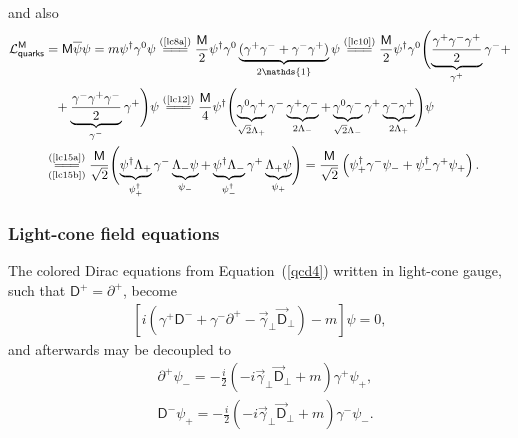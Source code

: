 \begin{note}
\begin{align*}
\end{align*}
and also
\begin{align*}
\mathcal{L}_{\textsf{quarks}}^\textsf{M}&=\textsf{M}\overline{\psi}\psi=m\psi^\dag\gamma^0\psi\stackrel{(\text{\cref{lc8a}})}{=\joinrel=\joinrel=}\frac{\textsf{M}}{2}\psi^\dag\gamma^0\underbrace{(\gamma^+\gamma^-+\gamma^-\gamma^+)}_{2\mathds{1}}\psi\stackrel{(\text{\cref{lc10}})}{=\joinrel=\joinrel=}\frac{\textsf{M}}{2}\psi^\dag\gamma^0\Biggl(\underbrace{\frac{\gamma^+\gamma^-\gamma^+}{2}}_{\gamma^+}\gamma^-+\\
&\phantom{=}+\underbrace{\frac{\gamma^-\gamma^+\gamma^-}{2}}_{\gamma^-}\gamma^+\Biggr)\psi\stackrel{(\text{\cref{lc12}})}{=\joinrel=\joinrel=}\frac{\textsf{M}}{4}\psi^\dag\Biggl(\underbrace{\gamma^0\gamma^+}_{\sqrt{2}\Lambda_+}\gamma^-\underbrace{\gamma^+\gamma^-}_{2\Lambda_-}+\underbrace{\gamma^0\gamma^-}_{\sqrt{2}\Lambda_-}\gamma^+\underbrace{\gamma^-\gamma^+}_{2\Lambda_+}\Biggr)\psi\\
&\underset{(\text{\cref{lc15b}})}{\stackrel{(\text{\cref{lc15a}})}{=\joinrel=\joinrel=}}\frac{\textsf{M}}{\sqrt{2}}\Biggl(\underbrace{\psi^\dag\Lambda_+}_{\psi^\dag_+}\gamma^-\underbrace{\Lambda_-\psi}_{\psi_-}+\underbrace{\psi^\dag\Lambda_-}_{\psi^\dag_-}\gamma^+\underbrace{\Lambda_+\psi}_{\psi_+}\Biggr)=\frac{\textsf{M}}{\sqrt{2}}\left(\psi_+^\dag\gamma^-\psi_-+\psi_-^\dag\gamma^+\psi_+\right).
\end{align*}
\end{note}


\subsubsection*{Light-cone field equations}
The colored Dirac equations from Equation~(\cref{qcd4}) written in light-cone gauge, such that $\textsf{D}^+=\partial^+$, become
\begin{align}\label{lc23}
\left[i\left(\gamma^+\textsf{D}^-+\gamma^-\partial^+-\vec{\gamma}_\perp\vec{\textsf{D}}_\perp\right)-m\right]\psi=0,
\end{align}
and afterwards may be decoupled to
\begin{subequations}
\begin{align}
&\partial^+\psi_-=-\frac{i}{2}\left(-i\vec{\gamma}_\perp\vec{\textsf{D}}_\perp+m\right)\gamma^+\psi_+,\label{lc25a}\\ 
&\textsf{D}^-\psi_+=-\frac{i}{2}\left(-i\vec{\gamma}_\perp\vec{\textsf{D}}_\perp+m\right)\gamma^-\psi_-.\label{lc25b}
\end{align}
\end{subequations}

